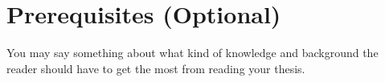 \chapter*{Prerequisites (Optional)}
You may say something about what kind of knowledge and background the reader should have to get the most from reading your thesis. 